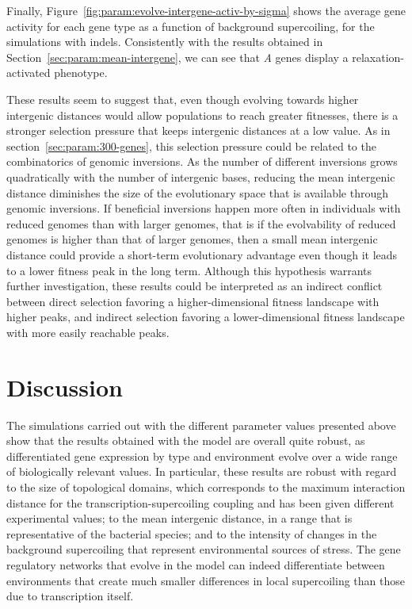 Finally, Figure~\ref{fig:param:evolve-intergene-activ-by-sigma} shows the average gene activity for each gene type as a function of background supercoiling, for the simulations with indels.
Consistently with the results obtained in Section~\ref{sec:param:mean-intergene}, we can see that \emph{A} genes display a relaxation-activated phenotype.

These results seem to suggest that, even though evolving towards higher intergenic distances would allow populations to reach greater fitnesses, there is a stronger selection pressure that keeps intergenic distances at a low value.
As in section~\ref{sec:param:300-genes}, this selection pressure could be related to the combinatorics of genomic inversions.
As the number of different inversions grows quadratically with the number of intergenic bases, reducing the mean intergenic distance diminishes the size of the evolutionary space that is available through genomic inversions.
If beneficial inversions happen more often in individuals with reduced genomes than with larger genomes, that is if the evolvability of reduced genomes is higher than that of larger genomes, then a small mean intergenic distance could provide a short-term evolutionary advantage even though it leads to a lower fitness peak in the long term.
Although this hypothesis warrants further investigation, these results could be interpreted as an indirect conflict between direct selection favoring a higher-dimensional fitness landscape with higher peaks, and indirect selection favoring a lower-dimensional fitness landscape with more easily reachable peaks.


\section{Discussion}

The simulations carried out with the different parameter values presented above show that the results obtained with the model are overall quite robust, as differentiated gene expression by type and environment evolve over a wide range of biologically relevant values.
In particular, these results are robust with regard to the size of topological domains, which corresponds to the maximum interaction distance for the transcription-supercoiling coupling and has been given different experimental values; to the mean intergenic distance, in a range that is representative of the bacterial species; and to the intensity of changes in the background supercoiling that represent environmental sources of stress.
The gene regulatory networks that evolve in the model can indeed differentiate between environments that create much smaller differences in local supercoiling than those due to transcription itself.

